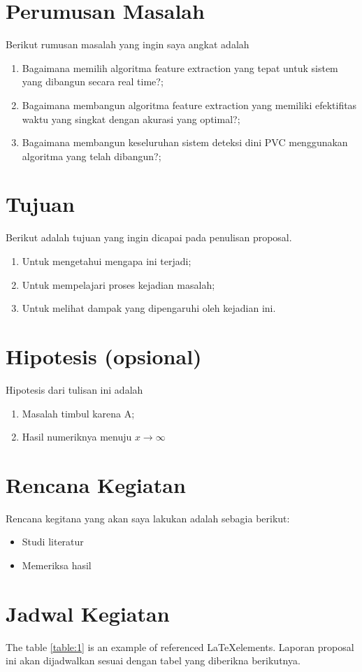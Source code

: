 \section{Perumusan Masalah}
Berikut rumusan masalah yang ingin saya angkat adalah
\begin{enumerate}
    \item Bagaimana memilih algoritma feature extraction yang tepat untuk sistem yang dibangun secara real time?;
    \item Bagaimana membangun algoritma feature extraction yang memiliki efektifitas waktu yang singkat dengan akurasi yang optimal?;
    \item Bagaimana membangun keseluruhan sistem deteksi dini PVC menggunakan algoritma yang telah dibangun?;
\end{enumerate}
\section{Tujuan}
Berikut adalah tujuan yang ingin dicapai pada penulisan proposal.
\begin{enumerate}
    \item Untuk mengetahui mengapa ini terjadi;
    \item Untuk mempelajari proses kejadian masalah;
    \item Untuk melihat dampak yang dipengaruhi oleh kejadian ini.
\end{enumerate}
\section{Hipotesis (opsional)}
Hipotesis dari tulisan ini adalah
\begin{enumerate}
    \item Masalah timbul karena A;
    \item Hasil numeriknya menuju $x \rightarrow \infty$
\end{enumerate}
\iflogTA
\else
\section{Rencana Kegiatan}
Rencana kegitana yang akan saya lakukan adalah sebagia berikut:
\begin{itemize}
    \item Studi literatur
    \item Memeriksa hasil
\end{itemize}
\section{Jadwal Kegiatan}
The table \ref{table:1} is an example of referenced \LaTeX elements. Laporan proposal ini akan dijadwalkan sesuai dengan tabel yang diberikna berikutnya. 

